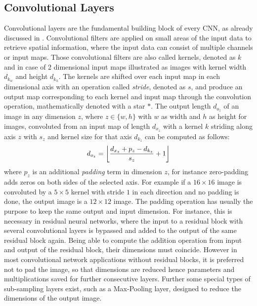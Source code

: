 
\subsection{Convolutional Layers}\label{sec:nn_theory_cnn}
Convolutional layers are the fundamental building block of every CNN, as already discussed in .
Convolutional filters are applied on small areas of the input data to retrieve spatial information, where the input data can consist of multiple channels or input maps.
Those convolutional filters are also called kernels, denoted as $k$ and in case of 2 dimensional input maps illustrated as images with kernel width $d_{k_w}$ and height $d_{k_h}$.
The kernels are shifted over each input map in each dimensional axis with an operation called \emph{stride}, denoted as $s$, and produce an output map corresponding to each kernel and input map through the convolution operation, mathematically denoted with a star $\ast$.
The output length $d_{o_z}$ of an image in any dimension $z$, where $z \in \{w, h\}$ with $w$ as width and $h$ as height for images, convoluted from an input map of length $d_{x_z}$ with a kernel $k$ striding along axis $z$ with $s_z$ and kernel size for that axis $d_{k_z}$ can be computed as follows:
\begin{equation}\label{eq:nn_theory_cnn_}
  d_{o_z} = \floor*{\frac{d_{x_z} + p_z - d_{k_z}}{s_z} + 1}
\end{equation}
where $p_z$ is an additional \emph{padding} term in dimension $z$, for instance zero-padding adds zeros on both sides of the selected axis.
For example if a $16 \times 16$ image is convoluted by a $5 \times 5$ kernel with stride $1$ in each direction and no padding is done, the output image is a $12 \times 12$ image.
The padding operation has usually the purpose to keep the same output and input dimension.
For instance, this is necessary in residual neural networks, where the input to a residual block with several convolutional layers is bypassed and added to the output of the same residual block again.
Being able to compute the addition operation from input and output of the residual block, their dimensions must coincide.
However in most convolutional network applications without residual blocks, it is preferred not to pad the image, so that dimensions are reduced hence parameters and multiplications saved for further consecutive layers.
Further some special types of sub-sampling layers exist, such as a Max-Pooling layer, designed to reduce the dimensions of the output image.

